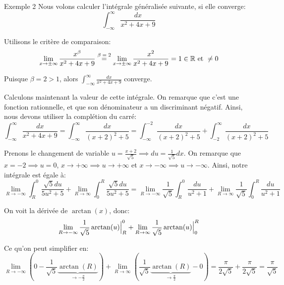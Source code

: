 \documentclass[a4paper]{article}
\begin{document}
\begin{parag}{Exemple 2}
    Nous volons calculer l'intégrale généralisée suivante, si elle converge: 
    \[\int_{-\infty}^{\infty} \frac{dx}{x^2 + 4x + 9}\]
    
    Utilisons le critère de comparaison: 
    \[\lim_{x \to \pm\infty} \frac{x^{\beta}}{x^2 + 4x + 9} \over{=}{$\beta = 2$} \lim_{x \to \pm\infty} \frac{x^2}{x^2 + 4x + 9} = 1 \in \mathbb{R} \text{ et } \neq 0\]
    
    Puisque $\beta = 2 > 1$, alors $\int_{-\infty}^{\infty} \frac{dx}{x^2 + 4x + 9}$ converge.

    Calculons maintenant la valeur de cette intégrale. On remarque que c'est une fonction rationnelle, et que son dénominateur a un discriminant négatif. Ainsi, nous devons utiliser la complétion du carré:
    \[\int_{-\infty}^{\infty} \frac{dx}{x^2 + 4x + 9} = \int_{-\infty}^{\infty} \frac{dx}{\left(x + 2\right)^2 + 5} = \int_{-\infty}^{-2} \frac{dx}{\left(x + 2\right)^2 + 5} + \int_{-2}^{\infty} \frac{dx}{\left(x + 2\right)^2 + 5}\]

    Prenons le changement de variable $u = \frac{x + 2}{\sqrt{5}} \implies du = \frac{1}{\sqrt{5}} dx$. On remarque que $x = -2 \implies u= 0$, $x \to +\infty \implies u \to +\infty$ et $x \to -\infty \implies u \to -\infty$. Ainsi, notre intégrale est égale à: 
    \[\lim_{R \to -\infty} \int_{R}^{0} \frac{\sqrt{5} du}{5u^2 + 5} + \lim_{R \to \infty} \int_{0}^{R} \frac{\sqrt{5}du}{5u^2 + 5} = \lim_{R \to -\infty} \frac{1}{\sqrt{5}}\int_{R}^{0} \frac{du}{u^2 + 1} + \lim_{R \to \infty} \frac{1}{\sqrt{5}} \int_{0}^{R} \frac{du}{u^2 + 1}\]
   
    On voit la dérivée de $\arctan\left(x\right)$, donc:
    \[\lim_{R \to -\infty} \frac{1}{\sqrt{5}} \arctan\left(u\right) \eval_{R}^{0} + \lim_{R \to \infty} \frac{1}{\sqrt{5}} \arctan\left(u\right) \eval_{0}^{R}\]

    Ce qu'on peut simplifier en:
    \[\lim_{R \to -\infty} \left(0 - \frac{1}{\sqrt{5}} \underbrace{\arctan\left(R\right)}_{\to - \frac{\pi}{2}}\right) + \lim_{R \to \infty} \left(\frac{1}{\sqrt{5}} \underbrace{\arctan\left(R\right)}_{\to \frac{\pi}{2}} - 0\right) = \frac{\pi}{2\sqrt{5}} + \frac{\pi}{2\sqrt{5}}  = \frac{\pi}{\sqrt{5}}\]
    
\end{parag}
\end{document}
